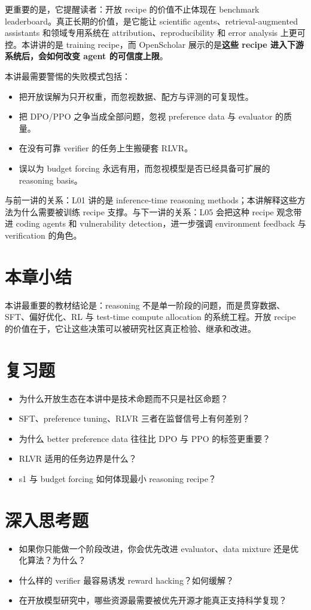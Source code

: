 \documentclass[a4paper]{article}
\begin{document}
更重要的是，它提醒读者：开放 recipe 的价值不止体现在 benchmark leaderboard。真正长期的价值，是它能让 scientific agents、retrieval-augmented assistants 和领域专用系统在 attribution、reproducibility 和 error analysis 上更可控。本讲讲的是 training recipe，而 OpenScholar 展示的是\textbf{这些 recipe 进入下游系统后，会如何改变 agent 的可信度上限}。

本讲最需要警惕的失败模式包括：
\begin{itemize}
\item 把开放误解为只开权重，而忽视数据、配方与评测的可复现性。
\item 把 DPO/PPO 之争当成全部问题，忽视 preference data 与 evaluator 的质量。
\item 在没有可靠 verifier 的任务上生搬硬套 RLVR。
\item 误以为 budget forcing 永远有用，而忽视模型是否已经具备可扩展的 reasoning basis。
\end{itemize}

与前一讲的关系：L01 讲的是 inference-time reasoning methods；本讲解释这些方法为什么需要被训练 recipe 支撑。与下一讲的关系：L05 会把这种 recipe 观念带进 coding agents 和 vulnerability detection，进一步强调 environment feedback 与 verification 的角色。

\section{本章小结}
本讲最重要的教材结论是：reasoning 不是单一阶段的问题，而是贯穿数据、SFT、偏好优化、RL 与 test-time compute allocation 的系统工程。开放 recipe 的价值在于，它让这些决策可以被研究社区真正检验、继承和改进。

\section{复习题}
\begin{itemize}
\item 为什么开放生态在本讲中是技术命题而不只是社区命题？
\item SFT、preference tuning、RLVR 三者在监督信号上有何差别？
\item 为什么 better preference data 往往比 DPO 与 PPO 的标签更重要？
\item RLVR 适用的任务边界是什么？
\item s1 与 budget forcing 如何体现最小 reasoning recipe？
\end{itemize}

\section{深入思考题}
\begin{itemize}
\item 如果你只能做一个阶段改进，你会优先改进 evaluator、data mixture 还是优化算法？为什么？
\item 什么样的 verifier 最容易诱发 reward hacking？如何缓解？
\item 在开放模型研究中，哪些资源最需要被优先开源才能真正支持科学复现？
\end{itemize}
\end{document}
